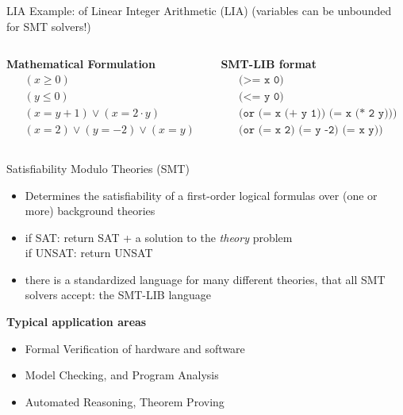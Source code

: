 \documentclass{cons-beamer}
\begin{document}
\begin{frame}{LIA}
  Example:  of Linear Integer Arithmetic (LIA)
  (variables can be unbounded for SMT solvers!)
  \vfill

  \begin{columns}
    \begin{column}{0.45\textwidth}
      \textbf{Mathematical Formulation}
      \begin{align*}
        & (x \geq 0)\\
        & (y \leq 0) \\
        & (x = y + 1) \lor (x = 2 \cdot y) \\
        & (x = 2) \lor (y = -2) \lor (x = y)
      \end{align*}
    \end{column}
    \begin{column}{0.45\textwidth}
      \textbf{SMT-LIB format}
      \begin{align*}
        &\texttt{(>= x 0)}\\
        &\texttt{(<= y 0)}\\
        &\texttt{(or (= x (+ y 1)) (= x (* 2 y)))}\\
        &\texttt{(or (= x 2) (= y -2) (= x y))}
      \end{align*}
    \end{column}
  \end{columns}
\end{frame}

\begin{frame}{Satisfiability Modulo Theories (SMT)}
  \begin{itemize}
    \item Determines the satisfiability of a first-order logical formulas over (one or more) background theories
    \item if SAT: return SAT + a solution to the \emph{theory} problem\\
          if UNSAT: return UNSAT
    \item there is a standardized language for many different theories, that all SMT solvers accept: the SMT-LIB language
  \end{itemize}
  \vfill

  \textbf{Typical application areas}
  \begin{itemize}
    \item {Formal Verification} of hardware and software
    \item {Model Checking}, and {Program Analysis}
    \item {Automated Reasoning}, {Theorem Proving}
  \end{itemize}
\end{frame}
\end{document}
